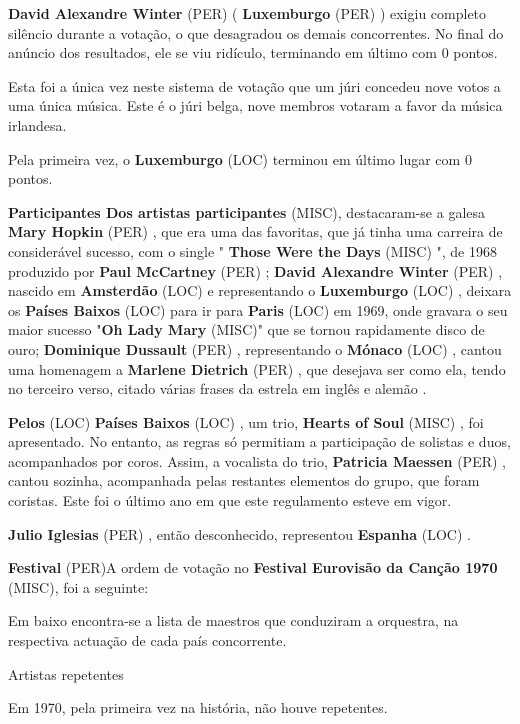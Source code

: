 \documentclass[12pt,a4paper]{article}
\begin{document}
\textbf{David Alexandre Winter} (PER) ( \textbf{Luxemburgo} (PER) ) exigiu completo silêncio durante a votação, o que desagradou os demais concorrentes. No final do anúncio dos resultados, ele se viu ridículo, terminando em último com 0 pontos.

Esta foi a única vez neste sistema de votação que um júri concedeu nove votos a uma única música. Este é o júri belga, nove membros votaram a favor da música irlandesa.

Pela primeira vez, o \textbf{Luxemburgo} (LOC) terminou em último lugar com 0 pontos.



\textbf{Participantes Dos artistas participantes} (MISC), destacaram-se a galesa \textbf{Mary Hopkin} (PER) , que era uma das favoritas, que já tinha uma carreira de considerável sucesso, com o single " \textbf{Those Were the Days} (MISC) ", de 1968 produzido por \textbf{Paul McCartney} (PER) ; \textbf{David Alexandre Winter} (PER) , nascido em \textbf{Amsterdão} (LOC) e representando o \textbf{Luxemburgo} (LOC) , deixara os \textbf{Países Baixos} (LOC) para ir para \textbf{Paris} (LOC) em 1969, onde gravara o seu maior sucesso "\textbf{Oh Lady Mary} (MISC)" que se tornou rapidamente disco de ouro; \textbf{Dominique Dussault} (PER) , representando o \textbf{Mónaco} (LOC) , cantou uma homenagem a \textbf{Marlene Dietrich} (PER) , que desejava ser como ela, tendo no terceiro verso, citado várias frases da estrela em inglês e alemão .

\textbf{Pelos} (LOC) \textbf{Países Baixos} (LOC) , um trio, \textbf{Hearts of Soul} (MISC) , foi apresentado. No entanto, as regras só permitiam a participação de solistas e duos, acompanhados por coros. Assim, a vocalista do trio, \textbf{Patricia Maessen} (PER) , cantou sozinha, acompanhada pelas restantes elementos do grupo, que foram coristas. Este foi o último ano em que este regulamento esteve em vigor.

\textbf{Julio Iglesias} (PER) , então desconhecido, representou \textbf{Espanha} (LOC) .



\textbf{Festival} (PER)A ordem de votação no \textbf{Festival Eurovisão da Canção 1970} (MISC), foi a seguinte:

Em baixo encontra-se a lista de maestros que conduziram a orquestra, na respectiva actuação de cada país concorrente.



Artistas repetentes

Em 1970, pela primeira vez na história, não houve repetentes.
\end{document}
